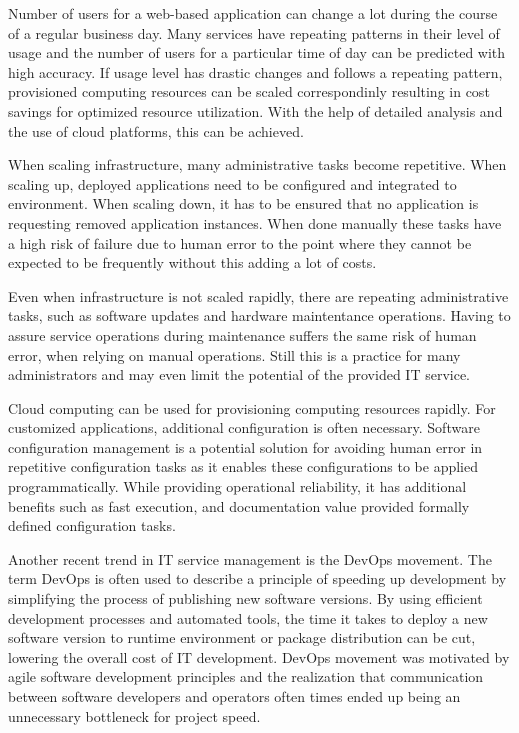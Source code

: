 \documentclass[officiallayout]{tktla}
\begin{document}
Number of users for a web-based application can change a lot during the course
of a regular business day. Many services have repeating patterns in their
level of usage and the number of users for a particular time of day can be
predicted with high accuracy. If usage level has drastic changes and follows a
repeating pattern, provisioned computing resources can be scaled correspondinly
resulting in cost savings for optimized resource utilization. With the help of
detailed analysis and the use of cloud platforms, this can be achieved.

When scaling infrastructure, many administrative tasks become repetitive. When
scaling up, deployed applications need to be configured and integrated to
environment. When scaling down, it has to be ensured that no application is
requesting removed application instances. When done manually these tasks have a
high risk of failure due to human error to the point where they cannot be
expected to be frequently without this adding a lot of costs.

Even when infrastructure is not scaled rapidly, there are repeating
administrative tasks, such as software updates and hardware maintentance
operations. Having to assure service operations during maintenance suffers the
same risk of human error, when relying on manual operations. Still this is a
practice for many administrators and may even limit the potential of the
provided IT service.

Cloud computing can be used for provisioning computing resources rapidly. For
customized applications, additional configuration is often necessary. Software
configuration management is a potential solution for avoiding human error in
repetitive configuration tasks as it enables these configurations to be applied
programmatically. While providing operational reliability, it has additional
benefits such as fast execution, and documentation value provided formally
defined configuration tasks.

Another recent trend in IT service management is the DevOps movement. The term
DevOps is often used to describe a principle of speeding up development by
simplifying the process of publishing new software versions. By using efficient
development processes and automated tools, the time it takes to
deploy a new software version to runtime environment or package distribution
can be cut, lowering the overall cost of IT development. DevOps movement was
motivated by agile software development principles and the realization that
communication between software developers and operators often times ended up
being an unnecessary bottleneck for project speed.
\end{document}
